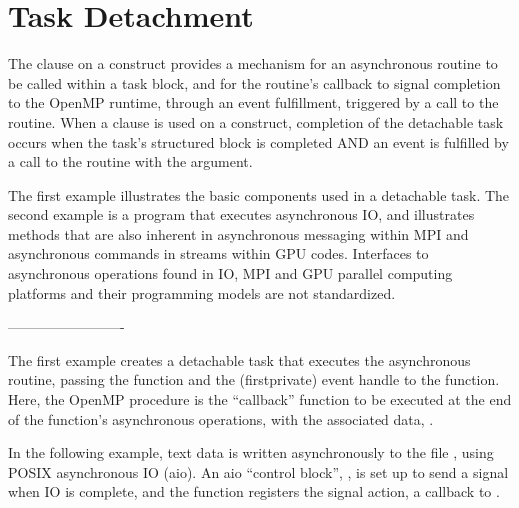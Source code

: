 \pagebreak
\section{Task Detachment}
\label{sec:task_detachment}


The  clause on a  construct provides a mechanism for an asynchronous
routine to be called within a task block, and for the routine's
callback to signal completion to the OpenMP runtime, through an 
event fulfillment, triggered by a call to the  routine.
When a  clause is used on a  construct,
completion of the detachable task occurs when the task's structured
block is completed AND an  event is
fulfilled by a call to the  
routine with the  argument.

The first example illustrates the basic components used in a detachable task.
The second example is a program that executes asynchronous IO, and illustrates 
methods that are also inherent in asynchronous messaging within MPI and asynchronous commands in 
streams within GPU codes.
Interfaces to asynchronous operations found in IO, MPI and GPU parallel computing platforms
and their programming models are not standardized. 

-------------------------

The first example creates a detachable task
that executes the asynchronous  routine,
passing the  function and the (firstprivate) event handle
to the function. Here, the OpenMP  procedure is
the ``callback'' function to be executed at the end of the  function's
asynchronous operations,
with the associated data, . 


\clearpage


In the following example, text data is written asynchronously to the file ,
using POSIX asynchronous IO (aio). An aio ``control block'', , is set up to
send a signal when IO is complete, and the  function registers
the signal action, a callback to .

